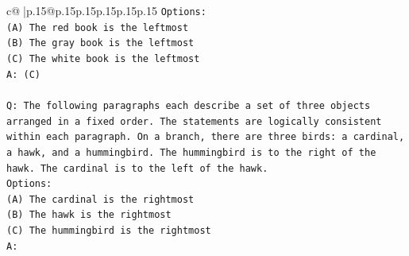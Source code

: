 \documentclass{article}
\begin{document}
{\begin{supertabular}{c@{$\;$}|p{.15\linewidth}@{}p{.15\linewidth}p{.15\linewidth}p{.15\linewidth}p{.15\linewidth}p{.15\linewidth}}
{{{\texttt{Options:} \\
\texttt{(A) The red book is the leftmost} \\
\texttt{(B) The gray book is the leftmost} \\
\texttt{(C) The white book is the leftmost} \\
\texttt{A: (C)} \\
\\ 
\texttt{Q: The following paragraphs each describe a set of three objects arranged in a fixed order. The statements are logically consistent within each paragraph. On a branch, there are three birds: a cardinal, a hawk, and a hummingbird. The hummingbird is to the right of the hawk. The cardinal is to the left of the hawk.} \\
\texttt{Options:} \\
\texttt{(A) The cardinal is the rightmost} \\
\texttt{(B) The hawk is the rightmost} \\
\texttt{(C) The hummingbird is the rightmost} \\
\texttt{A:} \\
            }
        }
    }
     \\ \\


\end{supertabular}}
\end{document}
